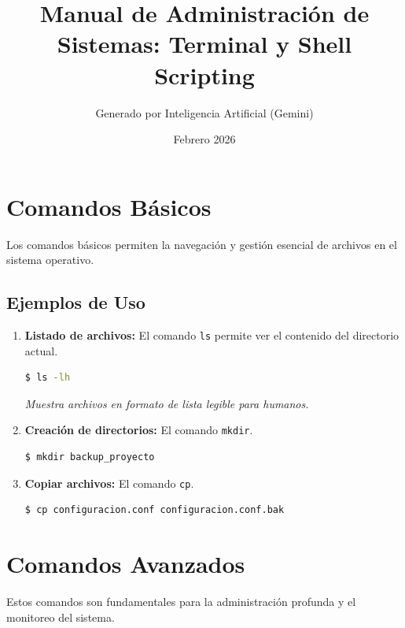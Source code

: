\documentclass[a4paper,12pt]{article}
\title{Manual de Administración de Sistemas: Terminal y Shell Scripting}
\author{Generado por Inteligencia Artificial (Gemini)}
\date{Febrero 2026}
\begin{document}
\maketitle
\newpage
\tableofcontents
\newpage

\section{Comandos Básicos}
Los comandos básicos permiten la navegación y gestión esencial de archivos en el sistema operativo.

\subsection{Ejemplos de Uso}
\begin{enumerate}
    \item \textbf{Listado de archivos:} El comando \texttt{ls} permite ver el contenido del directorio actual.
    \begin{lstlisting}[language=bash]
    $ ls -lh
    \end{lstlisting}
    \textit{Muestra archivos en formato de lista legible para humanos.}

    \item \textbf{Creación de directorios:} El comando \texttt{mkdir}.
    \begin{lstlisting}[language=bash]
    $ mkdir backup_proyecto
    \end{lstlisting}

    \item \textbf{Copiar archivos:} El comando \texttt{cp}.
    \begin{lstlisting}[language=bash]
    $ cp configuracion.conf configuracion.conf.bak
    \end{lstlisting}
\end{enumerate}

\section{Comandos Avanzados}
Estos comandos son fundamentales para la administración profunda y el monitoreo del sistema.
\end{document}
